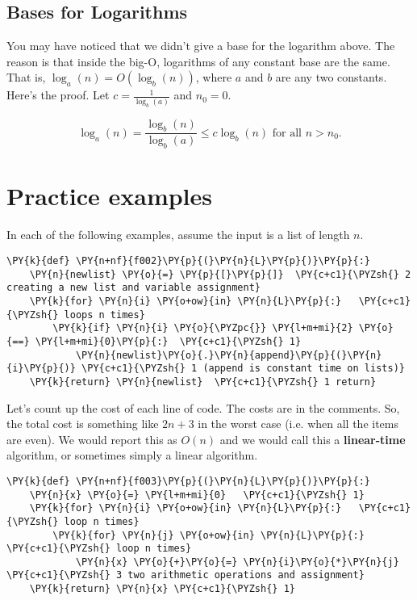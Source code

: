 \section{Bases for Logarithms}


You may have noticed that we didn't give a base for the logarithm above.
The reason is that inside the big-O, logarithms of any constant base are the same.
That is, $\log_a(n) = O(\log_b(n))$, where $a$ and $b$ are any two constants.
Here's the proof.
Let $c = \frac{1}{\log_b(a)}$ and $n_0 = 0$.  


\[
\log_a(n) = \frac{\log_b(n)}{\log_b(a)} \le c \log_b(n) \text{ for all }n>n_0.
\]

\chapter{Practice examples}


In each of the following examples, assume the input is a list of length $n$.

\begin{Verbatim}[commandchars=\\\{\}]
\PY{k}{def} \PY{n+nf}{f002}\PY{p}{(}\PY{n}{L}\PY{p}{)}\PY{p}{:}    
    \PY{n}{newlist} \PY{o}{=} \PY{p}{[}\PY{p}{]}  \PY{c+c1}{\PYZsh{} 2 creating a new list and variable assignment}
    \PY{k}{for} \PY{n}{i} \PY{o+ow}{in} \PY{n}{L}\PY{p}{:}   \PY{c+c1}{\PYZsh{} loops n times}
        \PY{k}{if} \PY{n}{i} \PY{o}{\PYZpc{}} \PY{l+m+mi}{2} \PY{o}{==} \PY{l+m+mi}{0}\PY{p}{:}  \PY{c+c1}{\PYZsh{} 1}
            \PY{n}{newlist}\PY{o}{.}\PY{n}{append}\PY{p}{(}\PY{n}{i}\PY{p}{)} \PY{c+c1}{\PYZsh{} 1 (append is constant time on lists)}
    \PY{k}{return} \PY{n}{newlist}  \PY{c+c1}{\PYZsh{} 1 return}
\end{Verbatim}



Let's count up the cost of each line of code.
The costs are in the comments.
So, the total cost is something like $2n+3$ in the worst case (i.e. when all the items are even).
We would report this as $O(n)$ and we would call this a \textbf{linear-time} algorithm, or sometimes simply a linear algorithm.

\begin{Verbatim}[commandchars=\\\{\}]
\PY{k}{def} \PY{n+nf}{f003}\PY{p}{(}\PY{n}{L}\PY{p}{)}\PY{p}{:}
    \PY{n}{x} \PY{o}{=} \PY{l+m+mi}{0}   \PY{c+c1}{\PYZsh{} 1}
    \PY{k}{for} \PY{n}{i} \PY{o+ow}{in} \PY{n}{L}\PY{p}{:}   \PY{c+c1}{\PYZsh{} loop n times}
        \PY{k}{for} \PY{n}{j} \PY{o+ow}{in} \PY{n}{L}\PY{p}{:}   \PY{c+c1}{\PYZsh{} loop n times}
            \PY{n}{x} \PY{o}{+}\PY{o}{=} \PY{n}{i}\PY{o}{*}\PY{n}{j}  \PY{c+c1}{\PYZsh{} 3 two arithmetic operations and assignment}
    \PY{k}{return} \PY{n}{x} \PY{c+c1}{\PYZsh{} 1}
\end{Verbatim}



